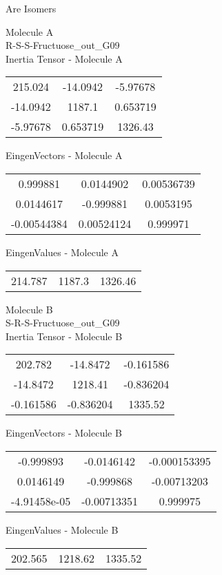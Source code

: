 \begin{center}
\vtab
\vtab
\textcolor{NavyBlue}{\Large Are Isomers}
\end{center}
\newpage
\begin{multicols}{2}
\begin{center}
Molecule A \\ 
R-S-S-Fructuose\_out\_G09
\\
Inertia Tensor - Molecule A \\
\vtab
\begin{tabular}{|c c c|}
215.024	 & 	-14.0942	 & 	-5.97678	 \\
-14.0942	 & 	1187.1	 & 	0.653719	 \\
-5.97678	 & 	0.653719	 & 	1326.43
\end{tabular}

\vtab
 EingenVectors - Molecule A     \\
\vtab
\begin{tabular}{|c c c|}
0.999881	 & 	0.0144902	 & 	0.00536739	 \\
0.0144617	 & 	-0.999881	 & 	0.0053195	 \\
-0.00544384	 & 	0.00524124	 & 	0.999971
\end{tabular}

\vtab
 EingenValues - Molecule A     \\
\vtab
\begin{tabular}{|c c c|}
214.787	 & 	1187.3	 & 	1326.46
\end{tabular}
\columnbreak

Molecule B \\ 
S-R-S-Fructuose\_out\_G09
\\
Inertia Tensor - Molecule B \\
\vtab
\begin{tabular}{|c c c|}
202.782	 & 	-14.8472	 & 	-0.161586	 \\
-14.8472	 & 	1218.41	 & 	-0.836204	 \\
-0.161586	 & 	-0.836204	 & 	1335.52
\end{tabular}

\vtab
 EingenVectors - Molecule B     \\
\vtab
\begin{tabular}{|c c c|}
-0.999893	 & 	-0.0146142	 & 	-0.000153395	 \\
0.0146149	 & 	-0.999868	 & 	-0.00713203	 \\
-4.91458e-05	 & 	-0.00713351	 & 	0.999975
\end{tabular}

\vtab
 EingenValues - Molecule B     \\
\vtab
\begin{tabular}{|c c c|}
202.565	 & 	1218.62	 & 	1335.52
\end{tabular}

\end{center}
\end{multicols}
